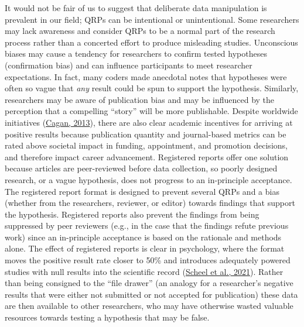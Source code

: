 \documentclass[]{cik}%
\begin{document}
It would not be fair of us to suggest that deliberate data manipulation
is prevalent in our field; QRPs can be intentional or unintentional.
Some researchers may lack awareness and consider QRPs to be a normal
part of the research process rather than a concerted effort to produce
misleading studies. Unconscious biases may cause a tendency for
researchers to confirm tested hypotheses (confirmation bias) and can
influence participants to meet researcher expectations. In fact, many
coders made anecdotal notes that hypotheses were often so vague that
\emph{any} result could be spun to support the hypothesis. Similarly,
researchers may be aware of publication bias and may be influenced by
the perception that a compelling ``story'' will be more publishable.
Despite worldwide initiatives (\protect\hyperlink{ref-DORA2013}{Cagan,
2013}), there are also clear academic incentives for arriving at
positive results because publication quantity and journal-based metrics
can be rated above societal impact in funding, appointment, and
promotion decisions, and therefore impact career advancement. Registered
reports offer one solution because articles are peer-reviewed before
data collection, so poorly designed research, or a vague hypothesis,
does not progress to an in-principle acceptance. The registered report
format is designed to prevent several QRPs and a bias (whether from the
researchers, reviewer, or editor) towards findings that support the
hypothesis. Registered reports also prevent the findings from being
suppressed by peer reviewers (e.g., in the case that the findings refute
previous work) since an in-principle acceptance is based on the
rationale and methods alone. The effect of registered reports is clear
in psychology, where the format moves the positive result rate closer to
50\% and introduces adequately powered studies with null results into
the scientific record (\protect\hyperlink{ref-scheel_excess_2020}{Scheel
et al., 2021}). Rather than being consigned to the ``file drawer'' (an
analogy for a researcher's negative results that were either not
submitted or not accepted for publication) these data are then available
to other researchers, who may have otherwise wasted valuable resources
towards testing a hypothesis that may be false.
\end{document}

